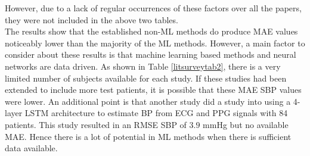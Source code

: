 \begin{itemize}
\end{itemize}\noindent However, due to a lack of regular occurrences of these factors over all the papers, they were not included in the above two tables.\\ \newline \noindent The results show that the established non-ML methods do produce MAE values noticeably lower than the majority of the ML methods. However, a main factor to consider about these results is that machine learning based methods and neural networks are data driven. As shown in Table \ref{litsurveytab2}, there is a very limited number of subjects available for each study. If these studies had been extended to include more test patients, it is possible that these MAE SBP values were lower. An additional point is that another study \cite{Su2017} did a study into using a 4-layer LSTM architecture to estimate BP from ECG and PPG signals with 84 patients. This study resulted in an RMSE SBP of $3.9$ mmHg but no available MAE. Hence there is a lot of potential in ML methods when there is sufficient data available.

